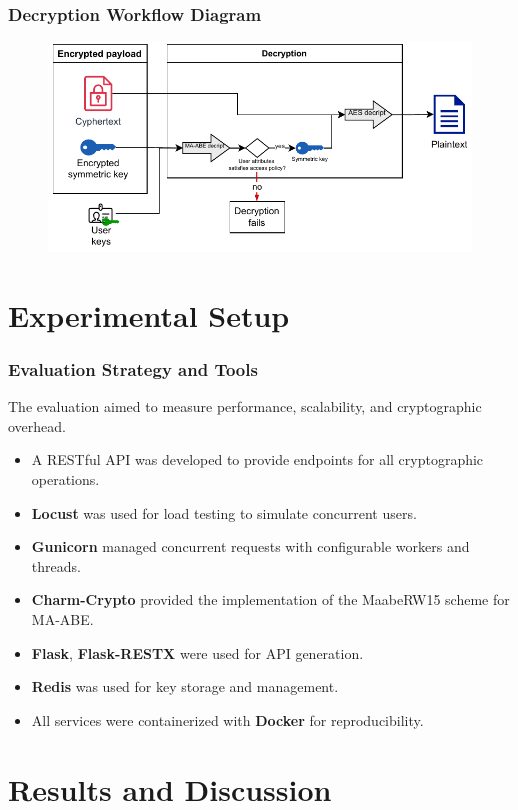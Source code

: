 \documentclass{beamer}
\begin{document}
\begin{frame}
\frametitle{Decryption Workflow Diagram}
\begin{figure}
\includegraphics[width=\textwidth,height=0.7\textheight,keepaspectratio]{images/diagrams/decryption_diagram.pdf}
\end{figure}
\end{frame}

\section{Experimental Setup}

\begin{frame}
\frametitle{Evaluation Strategy and Tools}
The evaluation aimed to measure performance, scalability, and cryptographic overhead.
\begin{itemize}
\item A RESTful API was developed to provide endpoints for all cryptographic operations.
\item \textbf{Locust} was used for load testing to simulate concurrent users.
\item \textbf{Gunicorn} managed concurrent requests with configurable workers and threads.
\item \textbf{Charm-Crypto} provided the implementation of the MaabeRW15 scheme for MA-ABE.
\item \textbf{Flask}, \textbf{Flask-RESTX} were used for API generation.
\item \textbf{Redis} was used for key storage and management.
\item All services were containerized with \textbf{Docker} for reproducibility.
\end{itemize}
\end{frame}

\section{Results and Discussion}
\end{document}
